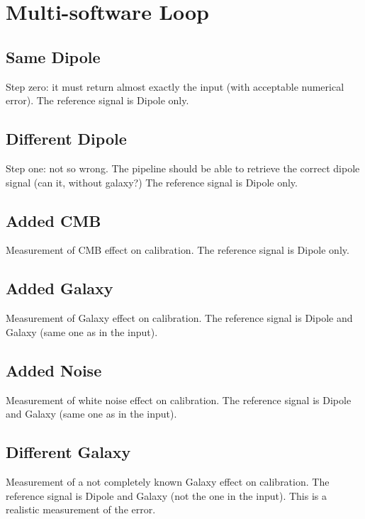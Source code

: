 \section{Multi-software Loop}
\label{sec:multi_software_loop}

\subsection{Same Dipole}

Step zero: it must return almost exactly the input (with acceptable numerical error).
The reference signal is Dipole only.

\subsection{Different Dipole}

Step one: not so wrong.
The pipeline should be able to retrieve the correct dipole signal (can it, without galaxy?)
The reference signal is Dipole only.

\subsection{Added CMB}

Measurement of CMB effect on calibration.
The reference signal is Dipole only.

\subsection{Added Galaxy}

Measurement of Galaxy effect on calibration.
The reference signal is Dipole and Galaxy (same one as in the input).

\subsection{Added Noise}

Measurement of white noise effect on calibration.
The reference signal is Dipole and Galaxy (same one as in the input).

\subsection{Different Galaxy}

Measurement of a not completely known Galaxy effect on calibration.
The reference signal is Dipole and Galaxy (not the one in the input).
This is a realistic measurement of the error.

